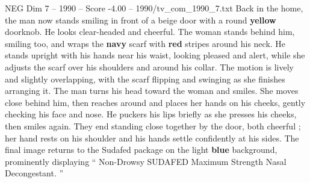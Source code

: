 \begin{textsample}{NEG Dim 7 – 1990 – Score -4.00 – 1990/tv\_com\_1990\_7.txt}
Back in the home, the man now stands smiling in front of a beige door with a round \textbf{yellow} doorknob.
He looks clear-headed and cheerful.
The woman stands behind him, smiling too, and wraps the \textbf{navy} scarf with \textbf{red} stripes around his neck.
He stands upright with his hands near his waist, looking pleased and alert, while she adjusts the scarf over his shoulders and around his collar.
The motion is lively and slightly overlapping, with the scarf flipping and swinging as she finishes arranging it.
The man turns his head toward the woman and smiles.
She moves close behind him, then reaches around and places her hands on his cheeks, gently checking his face and nose.
He puckers his lips briefly as she presses his cheeks, then smiles again.
They end standing close together by the door, both cheerful ; her hand rests on his shoulder and his hands settle confidently at his sides.
The final image returns to the Sudafed package on the light \textbf{blue} background, prominently displaying “ Non-Drowsy SUDAFED Maximum Strength Nasal Decongestant. ”

\end{textsample}
